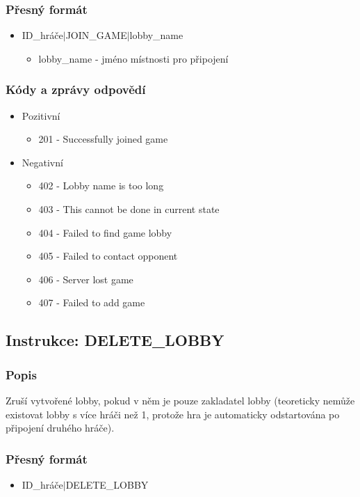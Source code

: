 \documentclass[12pt]{report}
\begin{document}
\subsubsection{Přesný formát}
\begin{itemize}
	\item ID\_hráče$|$JOIN\_GAME$|$lobby\_name
		\begin{itemize}
			\item lobby\_name - jméno místnosti pro připojení
		\end{itemize}
\end{itemize}

\subsubsection{Kódy a zprávy odpovědí}
\begin{itemize}
	\item Pozitivní
		\begin{itemize}
			\item 201 - Successfully joined game
		\end{itemize}
	\item Negativní
		\begin{itemize}
			\item 402 - Lobby name is too long
			\item 403 - This cannot be done in current state
			\item 404 - Failed to find game lobby
			\item 405 - Failed to contact opponent
			\item 406 - Server lost game
			\item 407 - Failed to add game
		\end{itemize}
\end{itemize}
%
%
%
\subsection{Instrukce: DELETE\_LOBBY}
\subsubsection{Popis}
Zruší vytvořené lobby, pokud v něm je pouze zakladatel lobby (teoreticky nemůže
existovat lobby s více hráči než 1, protože hra je automaticky odstartována po
připojení druhého hráče).

\subsubsection{Přesný formát}
\begin{itemize}
	\item ID\_hráče$|$DELETE\_LOBBY
\end{itemize}
\end{document}
